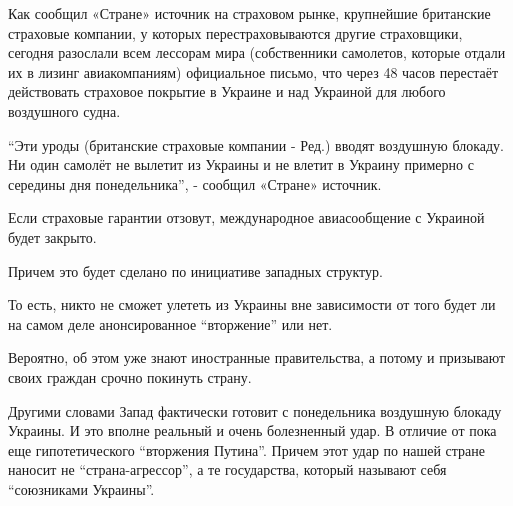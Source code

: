 Как сообщил «Стране» источник на страховом рынке, крупнейшие британские
страховые компании, у которых перестраховываются другие страховщики, сегодня
разослали всем лессорам мира (собственники самолетов, которые отдали их в
лизинг авиакомпаниям) официальное письмо, что через 48 часов перестаёт
действовать страховое покрытие в Украине и над Украиной для любого воздушного
судна. 

\enquote{Эти уроды (британские страховые компании - Ред.) вводят воздушную блокаду. Ни
один самолёт не вылетит из Украины и не влетит в Украину примерно с середины
дня понедельника}, - сообщил «Стране» источник.

Если страховые гарантии отзовут, международное авиасообщение с Украиной будет
закрыто.

Причем это будет сделано по инициативе западных структур.

То есть, никто не сможет улететь из Украины вне зависимости от того будет ли на
самом деле анонсированное \enquote{вторжение} или нет.

Вероятно, об этом уже знают иностранные правительства, а потому и призывают
своих граждан срочно покинуть страну. 

Другими словами Запад фактически готовит с понедельника воздушную блокаду
Украины. И это вполне реальный и очень болезненный удар. В отличие от пока еще
гипотетического \enquote{вторжения Путина}. Причем этот удар по нашей стране наносит не
\enquote{страна-агрессор}, а те государства, который называют себя \enquote{союзниками
Украины}.

